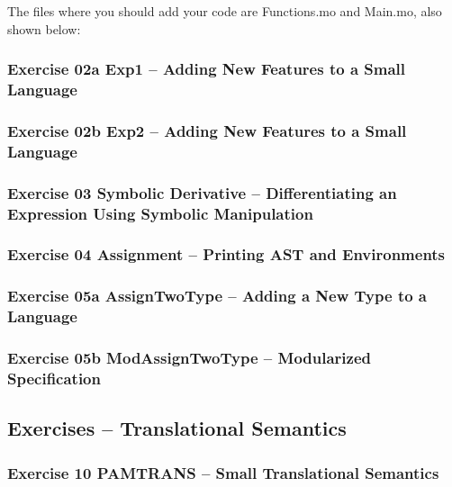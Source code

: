 \documentclass[10.5pt,a4]{article}
\begin{document}
The files where you should add your code are Functions.mo and Main.mo, also shown below:




\subsubsection{Exercise 02a Exp1 –  Adding New Features to a Small Language}



\subsubsection{Exercise 02b Exp2 –  Adding New Features to a Small Language}



\subsubsection{Exercise 03 Symbolic Derivative –  Differentiating an Expression Using Symbolic Manipulation}



\subsubsection{Exercise 04 Assignment – Printing AST and Environments}



\subsubsection{Exercise 05a AssignTwoType – Adding a New Type to a Language}



\subsubsection{Exercise 05b ModAssignTwoType – Modularized Specification}


\subsection{Exercises – Translational Semantics}
\subsubsection{Exercise 10 PAMTRANS – Small Translational Semantics}

\end{document}
